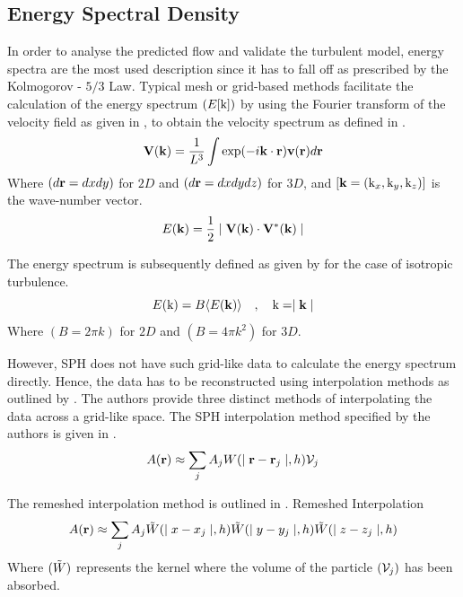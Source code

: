 \subsection{Energy Spectral Density}
In order to analyse the predicted flow and validate the turbulent model, energy spectra are the most used description since it has to fall off as prescribed by the  Kolmogorov - $5/3$ Law.
Typical mesh or grid-based methods facilitate the calculation of the energy spectrum $(E[\mathrm{k}])$ by using the Fourier transform of the velocity field as given in , to obtain the velocity spectrum as defined in .
\begin{equation}
    \mathbf{V}(\mathbf{k}) = \frac{1}{L^3} \int \exp(-i \mathbf{k} \cdot \mathbf{r}) \mathbf{v}(\mathbf{r}) d\mathbf{r}
    \label{eq:Shi2013-vel-FT}
\end{equation}
Where $(d\mathbf{r}=dxdy)$ for $2D$ and $(d\mathbf{r}=dxdydz)$ for $3D$, and $[\mathbf{k} = (\mathrm{k}_x, \mathrm{k}_y, \mathrm{k}_z)]$ is the wave-number vector.
\begin{equation}
    E(\mathbf{k}) = \frac{1}{2} \mid  \mathbf{V}(\mathbf{k}) \cdot \mathbf{V}^*(\mathbf{k})  \mid
    \label{eq:Shi2013-vel-spectrum}
\end{equation}

The energy spectrum is subsequently defined as given by  for the case of isotropic turbulence.
\begin{equation}
    E(\mathrm{k}) = B \langle E(\mathbf{k}) \rangle \quad , \quad \mathrm{k} = \mid \mathbf{k} \mid
    \label{eq:Shi2013-energy-spectrum}
\end{equation}
Where $(B=2\pi k)$ for $2D$ and $(B=4\pi k^2)$ for $3D$.

However, SPH does not have such grid-like data to calculate the energy spectrum directly. Hence, the data has to be reconstructed using interpolation methods as outlined by \cite{Shi2013}.
The authors provide three distinct methods of interpolating the data across a grid-like space. 
The SPH interpolation method specified by the authors is given in .
\begin{equation}
    A(\mathbf{r}) \approx \sum_j A_j W(\mid \mathbf{r} - \mathbf{r}_j \mid, h) \mathcal{V}_j
    \label{eq:Shi2013-sph-interpolation}
\end{equation}

The remeshed interpolation method is outlined in .
Remeshed Interpolation
\begin{equation}
    A(\mathbf{r}) \approx \sum_j A_j \Tilde{W}(\mid x-x_j \mid, h) \Tilde{W}(\mid y-y_j \mid, h) \Tilde{W}(\mid z-z_j \mid, h)
    \label{eq:Shi2013-remeshed-interpolation}
\end{equation}
Where $(\Tilde{W})$ represents the kernel where the volume of the particle $(\mathcal{V}_j)$ has been absorbed.


